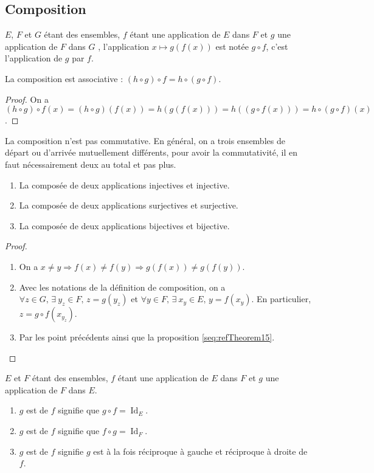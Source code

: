 \subsection{Composition}
\begin{definition}
[Composition]
\(𝐸\), \(𝐹\) et \(𝐺\) étant des ensembles,
\(𝑓\) étant une application de \(𝐸\) dans \(𝐹\) et \(𝑔\) une application
de \(𝐹\) dans \(𝐺\) , l'application \(𝑥↦𝑔(𝑓(𝑥))\) est notée \(𝑔∘𝑓\), c'est l'application
 de \(𝑔\) par \(𝑓\).
\end{definition}
%
\begin{theorem}
La composition est associative : \((ℎ∘𝑔)∘𝑓=ℎ∘(𝑔∘𝑓)\).
\end{theorem}
\begin{proof}
On a \((ℎ∘𝑔)∘𝑓(𝑥)=(ℎ∘𝑔)(𝑓(𝑥))=ℎ(𝑔(𝑓(𝑥)))=ℎ((𝑔∘𝑓(𝑥)))=ℎ∘(𝑔∘𝑓)(𝑥)\).
\end{proof}
\begin{remark}
La composition n'est pas commutative. En général, on a trois ensembles
de départ ou d'arrivée mutuellement différents, pour avoir la commutativité,
il en faut nécessairement deux au total et pas plus.
\end{remark}
%
\begin{theorem}
\begin{enumerate}
\item La composée de deux applications injectives et injective.
\item La composée de deux applications surjectives et surjective.
\item La composée de deux applications bijectives et bijective.
\end{enumerate}
\end{theorem}
\begin{proof}
\par\noindent
\begin{enumerate}
\item On a \(𝑥≠𝑦⇒𝑓(𝑥)≠𝑓(𝑦)⇒𝑔(𝑓(𝑥))≠𝑔(𝑓(𝑦))\).
\item Avec les notations de la définition de composition, on a
\(∀𝑧∈𝐺\text{, }∃~𝑦_{𝑧}∈𝐹\text{, }𝑧=𝑔(𝑦_{𝑧})\) et
\(∀𝑦∈𝐹\text{, }∃~𝑥_{𝑦}∈𝐸\text{, }𝑦=𝑓(𝑥_{𝑦})\).
En particulier, \(𝑧=𝑔∘𝑓(𝑥_{𝑦_{𝑧}})\).
\item Par les point précédents ainsi que la proposition \ref{seq:refTheorem15}.
\end{enumerate}
\end{proof}
%
\begin{definition}
\(𝐸\) et \(𝐹\) étant des ensembles,
\(𝑓\) étant une application de \(𝐸\) dans \(𝐹\) et
\(𝑔\) une application de \(𝐹\) dans \(𝐸\).
\begin{enumerate}
\item \(𝑔\) est  de \(𝑓\) signifie que
\(𝑔∘𝑓=\operatorname{Id}_{𝐸}\).
\item \(𝑔\) est  de \(𝑓\) signifie que
\(𝑓∘𝑔=\operatorname{Id}_{𝐹}\).
\item \(𝑔\) est  de \(𝑓\) signifie \(𝑔\) est à la
fois réciproque à gauche et réciproque à droite de \(𝑓\).
\end{enumerate}
\end{definition}
